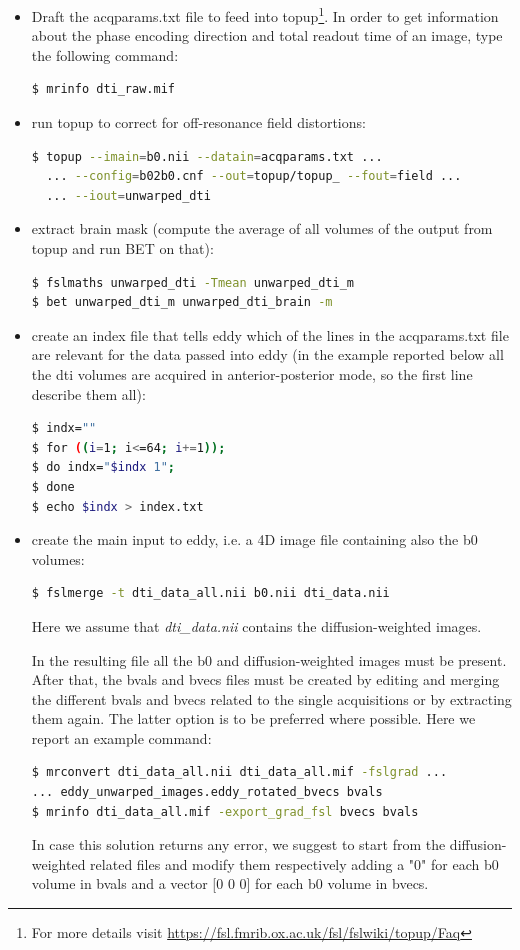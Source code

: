 \documentclass[a4paper,11pt]{article}
\begin{document}
\begin{itemize}

\item Draft the acqparams.txt file to feed into topup\footnote{For more details visit \url{https://fsl.fmrib.ox.ac.uk/fsl/fslwiki/topup/Faq}}. In order to get information about the phase encoding direction and total readout time of an image, type the following command:
\begin{lstlisting}[language=bash]
$ mrinfo dti_raw.mif
\end{lstlisting}

\item run topup to correct for off-resonance field distortions:
\begin{lstlisting}[language=bash]
$ topup --imain=b0.nii --datain=acqparams.txt ...
  ... --config=b02b0.cnf --out=topup/topup_ --fout=field ...
  ... --iout=unwarped_dti
\end{lstlisting}

\item extract brain mask (compute the average of all volumes of the output from topup and run BET on that):
\begin{lstlisting}[language=bash]
$ fslmaths unwarped_dti -Tmean unwarped_dti_m
$ bet unwarped_dti_m unwarped_dti_brain -m
\end{lstlisting}

\item create an index file that tells eddy which of the lines in the acqparams.txt file are relevant for the data passed into eddy (in the example reported below all the dti volumes are acquired in anterior-posterior mode, so the first line describe them all):
\begin{lstlisting}[language=bash]
$ indx=""
$ for ((i=1; i<=64; i+=1)); 
$ do indx="$indx 1"; 
$ done
$ echo $indx > index.txt
\end{lstlisting}

\item create the main input to eddy, i.e. a 4D image file containing also the b0 volumes:
\begin{lstlisting}[language=bash]
$ fslmerge -t dti_data_all.nii b0.nii dti_data.nii
\end{lstlisting}
Here we assume that \emph{dti\_data.nii} contains the diffusion-weighted images.

In the resulting file all the b0 and diffusion-weighted images must be present. After that, the bvals and bvecs files must be created by editing and merging the different bvals and bvecs related to the single acquisitions or by extracting them again. The latter option is to be preferred where possible. Here we report an example command:
\begin{lstlisting}[language=bash]
$ mrconvert dti_data_all.nii dti_data_all.mif -fslgrad ...
... eddy_unwarped_images.eddy_rotated_bvecs bvals
$ mrinfo dti_data_all.mif -export_grad_fsl bvecs bvals
\end{lstlisting}
In case this solution returns any error, we suggest to start from the diffusion-weighted related files and modify them respectively adding a "0" for each b0 volume in bvals and a vector [0 0 0] for each b0 volume in bvecs.


\end{itemize}
\end{document}
